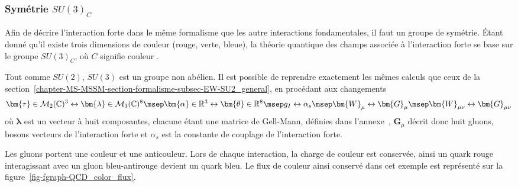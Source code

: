 \subsubsection{Symétrie $SU(3)_C$}\label{chapter-MS-MSSM-section-formalisme-subsec-QCD-subsubsec-SU3C}
Afin de décrire l'interaction forte dans le même formalisme que les autre interactions fondamentales, il faut un groupe de symétrie. Étant donné qu'il existe trois dimensions de couleur (rouge, verte, bleue), la théorie quantique des champs associée à l'interaction forte se base sur le groupe $SU(3)_C$, où $C$ signifie \og couleur \fg.
\par Tout comme $SU(2)$, $SU(3)$ est un groupe non abélien. Il est possible de reprendre exactement les mêmes calculs que ceux de la section~\ref{chapter-MS-MSSM-section-formalisme-subsec-EW-SU2_general}, en procédant aux changements
\begin{equation}
\bm{\tau} \in \mathcal{M}_2(\mathbb{C})^3 \leftrightarrow \bm{\lambda} \in \mathcal{M}_3(\mathbb{C})^8
\msep
\bm{\alpha}\in\mathbb{R}^3 \leftrightarrow \bm{\theta}\in\mathbb{R}^8
\msep
g_I \leftrightarrow \alpha_s
\msep
\bm{W}_\mu \leftrightarrow \bm{G}_\mu
\msep
\bm{W}_{\mu\nu} \leftrightarrow \bm{G}_{\mu\nu}
\label{eq-chapter-MS-MSSM-section-formalisme-subsec-QCD-subsubsec-SU3C-analogieSU2}
\end{equation}
où $\bm{\lambda}$ est un vecteur à huit composantes, chacune étant une matrice de Gell-Mann, définies dans l'annexe~, $\bm{G}_\mu$ décrit donc huit gluons, bosons vecteurs de l'interaction forte et $\alpha_s$ est la constante de couplage de l'interaction forte.
\par Les gluons portent une couleur et une anticouleur. Lors de chaque interaction, la charge de couleur est conservée, ainsi un quark rouge interagissant avec un gluon bleu-antirouge devient un quark bleu. Le flux de couleur ainsi conservé dans cet exemple est représenté sur la figure~\ref{fig-fgraph-QCD_color_flux}.
